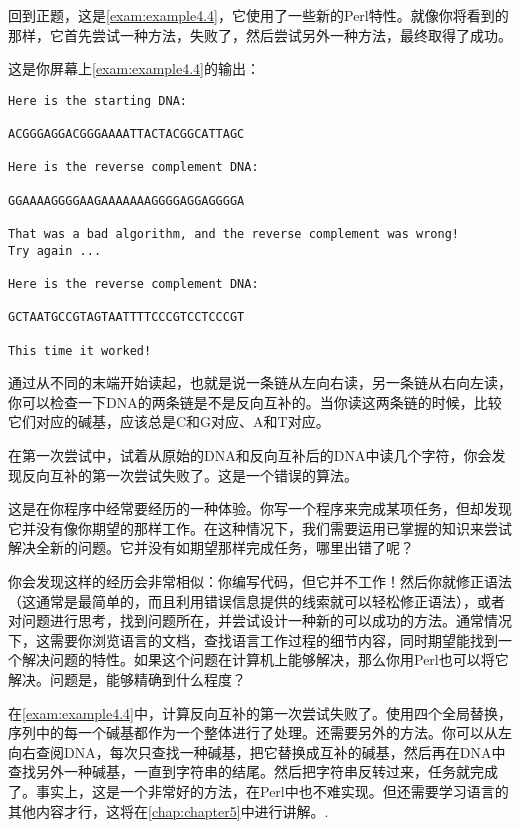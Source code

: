 回到正题，这是\autoref{exam:example4.4}，它使用了一些新的Perl特性。就像你将看到的那样，它首先尝试一种方法，失败了，然后尝试另外一种方法，最终取得了成功。



这是你屏幕上\autoref{exam:example4.4}的输出：

\begin{lstlisting}
Here is the starting DNA:

ACGGGAGGACGGGAAAATTACTACGGCATTAGC

Here is the reverse complement DNA:

GGAAAAGGGGAAGAAAAAAAGGGGAGGAGGGGA

That was a bad algorithm, and the reverse complement was wrong!
Try again ...

Here is the reverse complement DNA:

GCTAATGCCGTAGTAATTTTCCCGTCCTCCCGT

This time it worked!
\end{lstlisting}

通过从不同的末端开始读起，也就是说一条链从左向右读，另一条链从右向左读，你可以检查一下DNA的两条链是不是反向互补的。当你读这两条链的时候，比较它们对应的碱基，应该总是C和G对应、A和T对应。

在第一次尝试中，试着从原始的DNA和反向互补后的DNA中读几个字符，你会发现反向互补的第一次尝试失败了。这是一个错误的算法。

这是在你程序中经常要经历的一种体验。你写一个程序来完成某项任务，但却发现它并没有像你期望的那样工作。在这种情况下，我们需要运用已掌握的知识来尝试解决全新的问题。它并没有如期望那样完成任务，哪里出错了呢？

你会发现这样的经历会非常相似：你编写代码，但它并不工作！然后你就修正语法（这通常是最简单的，而且利用错误信息提供的线索就可以轻松修正语法），或者对问题进行思考，找到问题所在，并尝试设计一种新的可以成功的方法。通常情况下，这需要你浏览语言的文档，查找语言工作过程的细节内容，同时期望能找到一个解决问题的特性。如果这个问题在计算机上能够解决，那么你用Perl也可以将它解决。问题是，能够精确到什么程度？

在\autoref{exam:example4.4}中，计算反向互补的第一次尝试失败了。使用四个全局替换，序列中的每一个碱基都作为一个整体进行了处理。还需要另外的方法。你可以从左向右查阅DNA，每次只查找一种碱基，把它替换成互补的碱基，然后再在DNA中查找另外一种碱基，一直到字符串的结尾。然后把字符串反转过来，任务就完成了。事实上，这是一个非常好的方法，在Perl中也不难实现。但还需要学习语言的其他内容才行，这将在\autoref{chap:chapter5}中进行讲解。.

